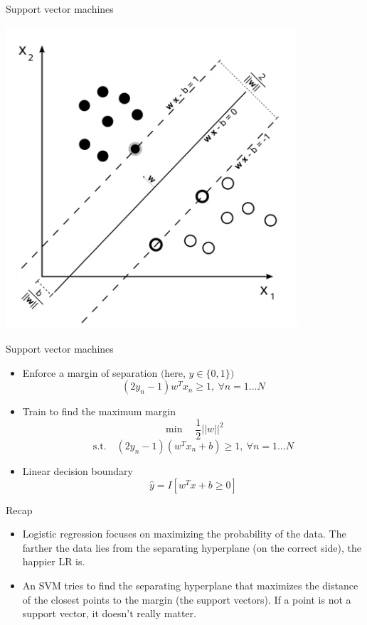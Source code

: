 \documentclass[12pt,notes,mathserif]{beamer}
\providecommand{\tightlist}{%
	\setlength{\itemsep}{0pt}\setlength{\parskip}{0pt}}
\begin{document}
\begin{frame}{Support vector machines}

\begin{center}
\includegraphics[width=.7\textwidth]{2018-04-15-19-55-03.png}
\end{center}

\end{frame}

\begin{frame}{Support vector machines}

\begin{itemize}
\tightlist
\item
  Enforce a margin of separation \((\)here, \(y\in\{0,1\})\) \[
  (2y_{n}-1)w^{T}x_{n}\geq 1,\ \forall n=1\ldots N
  \]
\item
  Train to find the maximum margin \[
  \min\quad \frac{1}{2}||w||^{2}
  \] \[
  \textrm{s.t.}\quad (2y_{n}-1)(w^{T}x_{n}+b)\geq 1,\ \forall n=1\ldots N
  \]
\item
  Linear decision boundary \[
  \hat{y}=I[w^{T}x+b\geq 0]
  \]
\end{itemize}

\end{frame}

\begin{frame}{Recap}

\begin{itemize}
\item
  Logistic regression focuses on maximizing the probability of the data.
  The farther the data lies from the separating hyperplane (on the
  correct side), the happier LR is.
\item
  An SVM tries to find the separating hyperplane that maximizes the
  distance of the closest points to the margin (the support vectors). If
  a point is not a support vector, it doesn't really matter.
\end{itemize}

\end{frame}
\end{document}
